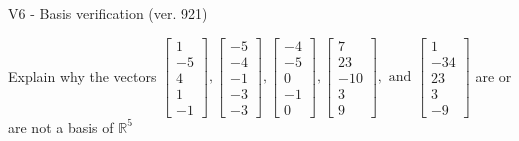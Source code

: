 \begin{exercise}
  \begin{exerciseTitle}V6 - Basis verification (ver. 921)\end{exerciseTitle}
  \begin{exerciseStatement}
    Explain why the vectors \(\left[\begin{array}{r}
1 \\
-5 \\
4 \\
1 \\
-1
\end{array}\right] , \left[\begin{array}{r}
-5 \\
-4 \\
-1 \\
-3 \\
-3
\end{array}\right] , \left[\begin{array}{r}
-4 \\
-5 \\
0 \\
-1 \\
0
\end{array}\right] , \left[\begin{array}{r}
7 \\
23 \\
-10 \\
3 \\
9
\end{array}\right] , \text{ and } \left[\begin{array}{r}
1 \\
-34 \\
23 \\
3 \\
-9
\end{array}\right]\) are or are not a basis of \(\mathbb{R}^5\)	



\end{exerciseStatement}
\end{exercise}

